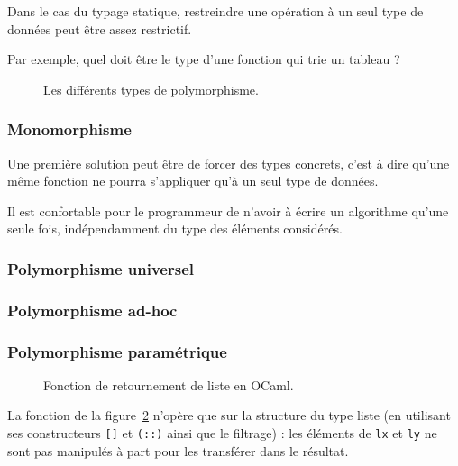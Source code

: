 Dans le cas du typage statique, restreindre une opération à un seul type de
données peut être assez restrictif.

Par exemple, quel doit être le type d'une fonction qui trie un tableau ?

\begin{figure}
\centering

\caption{Les différents types de polymorphisme.}
\label{fig:types-de-polymorphisme}
\end{figure}

\subsubsection{Monomorphisme}

Une première solution peut être de forcer des types concrets, c'est à dire
qu'une même fonction ne pourra s'appliquer qu'à un seul type de données.

Il est confortable pour le programmeur de n'avoir à écrire un algorithme qu'une
seule fois, indépendamment du type des éléments considérés.

\subsubsection{Polymorphisme universel}


\subsubsection{Polymorphisme ad-hoc}


\subsubsection{Polymorphisme paramétrique}


\begin{figure}
  \caption{Fonction de retournement de liste en OCaml.}
  \label{fig:listrev}
\end{figure}

La fonction de la figure~\ref{fig:listrev} n'opère que sur la structure du type
liste (en utilisant ses constructeurs \texttt{{[}{]}} et \texttt{(::)} ainsi que
le filtrage) : les éléments de \texttt{lx} et \texttt{ly} ne sont pas manipulés
à part pour les transférer dans le résultat.

